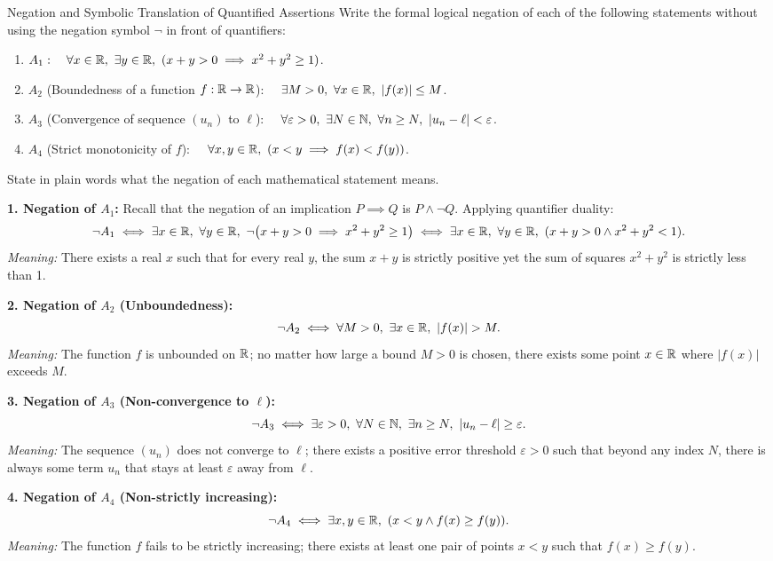\begin{exercise}{Negation and Symbolic Translation of Quantified Assertions}
Write the formal logical negation of each of the following statements without using the negation symbol $\neg$ in front of quantifiers:
\begin{enumerate}[leftmargin=1.5em,itemsep=2pt]
  \item $A_1: \quad \forall x \in \mathbb{R},\ \exists y \in \mathbb{R},\ (x + y > 0 \implies x^2 + y^2 \ge 1)$.
  \item $A_2$ (Boundedness of a function $f: \mathbb{R} \to \mathbb{R}$): $\quad \exists M > 0,\ \forall x \in \mathbb{R},\ |f(x)| \le M$.
  \item $A_3$ (Convergence of sequence $(u_n)$ to $\ell$): $\quad \forall \varepsilon > 0,\ \exists N \in \mathbb{N},\ \forall n \ge N,\ |u_n - \ell| < \varepsilon$.
  \item $A_4$ (Strict monotonicity of $f$): $\quad \forall x, y \in \mathbb{R},\ (x < y \implies f(x) < f(y))$.
\end{enumerate}
State in plain words what the negation of each mathematical statement means.
\end{exercise}

\begin{tabletworkspace}[5.0cm]
\end{tabletworkspace}

\begin{solution}
\textbf{1. Negation of $A_1$:}
Recall that the negation of an implication $P \implies Q$ is $P \land \neg Q$. Applying quantifier duality:
\[
\neg A_1 \iff \exists x \in \mathbb{R},\ \forall y \in \mathbb{R},\ \neg\bigl(x + y > 0 \implies x^2 + y^2 \ge 1\bigr) \iff \exists x \in \mathbb{R},\ \forall y \in \mathbb{R},\ (x + y > 0 \land x^2 + y^2 < 1).
\]
\emph{Meaning:} There exists a real $x$ such that for every real $y$, the sum $x+y$ is strictly positive yet the sum of squares $x^2+y^2$ is strictly less than 1.

\textbf{2. Negation of $A_2$ (Unboundedness):}
\[
\neg A_2 \iff \forall M > 0,\ \exists x \in \mathbb{R},\ |f(x)| > M.
\]
\emph{Meaning:} The function $f$ is unbounded on $\mathbb{R}$; no matter how large a bound $M > 0$ is chosen, there exists some point $x \in \mathbb{R}$ where $|f(x)|$ exceeds $M$.

\textbf{3. Negation of $A_3$ (Non-convergence to $\ell$):}
\[
\neg A_3 \iff \exists \varepsilon > 0,\ \forall N \in \N,\ \exists n \ge N,\ |u_n - \ell| \ge \varepsilon.
\]
\emph{Meaning:} The sequence $(u_n)$ does not converge to $\ell$; there exists a positive error threshold $\varepsilon > 0$ such that beyond any index $N$, there is always some term $u_n$ that stays at least $\varepsilon$ away from $\ell$.

\textbf{4. Negation of $A_4$ (Non-strictly increasing):}
\[
\neg A_4 \iff \exists x, y \in \mathbb{R},\ (x < y \land f(x) \ge f(y)).
\]
\emph{Meaning:} The function $f$ fails to be strictly increasing; there exists at least one pair of points $x < y$ such that $f(x) \ge f(y)$.
\end{solution}

